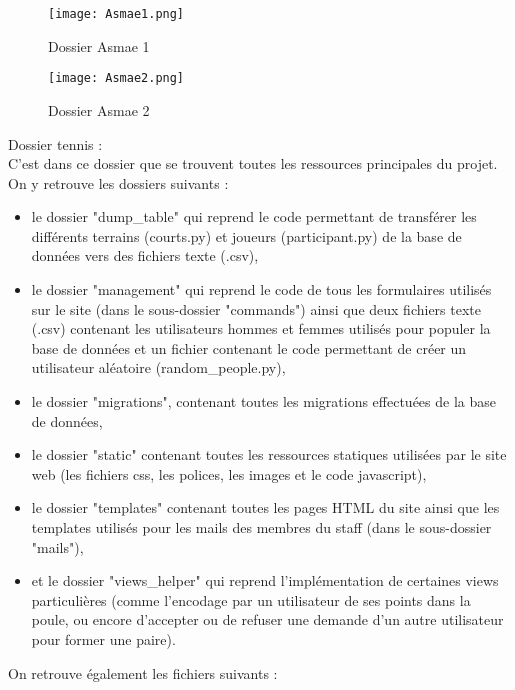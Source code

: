 \begin{figure}[H]
\centering
\texttt{[image: Asmae1.png]}
\caption{Dossier Asmae 1}
\end{figure}
\vspace{-5cm}
\begin{figure}[H]
\centering
\texttt{[image: Asmae2.png]}
\caption{Dossier Asmae 2}
\end{figure}

Dossier tennis :\\

C'est dans ce dossier que se trouvent toutes les ressources principales du projet. On y retrouve les dossiers suivants :
\begin{itemize}
	\item le dossier "dump\_table" qui reprend le code permettant de transférer les différents terrains (courts.py) et joueurs (participant.py) de la base de données vers des fichiers texte (.csv),
	\item le dossier "management" qui reprend le code de tous les formulaires utilisés sur le site (dans le sous-dossier "commands") ainsi que deux fichiers texte (.csv) contenant les utilisateurs hommes et femmes utilisés pour populer la base de données et un fichier contenant le code permettant de créer un utilisateur aléatoire (random\_people.py),
	\item le dossier "migrations", contenant toutes les migrations effectuées de la base de données,
	\item le dossier "static" contenant toutes les ressources statiques utilisées par le site web (les fichiers css, les polices, les images et le code javascript),
	\item le dossier "templates" contenant toutes les pages HTML du site ainsi que les templates utilisés pour les mails des membres du staff (dans le sous-dossier "mails"),
	\item et le dossier "views\_helper" qui reprend l'implémentation de certaines views particulières (comme l'encodage par un utilisateur de ses points dans la poule, ou encore d'accepter ou de refuser une demande d'un autre utilisateur pour former une paire).\\
\end{itemize}

On retrouve également les fichiers suivants :\\

